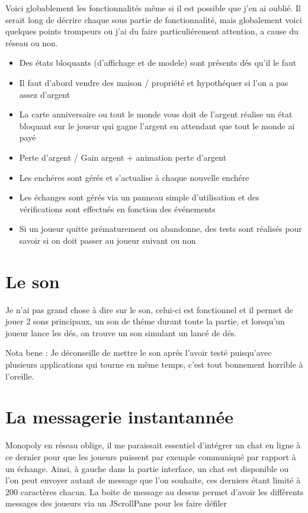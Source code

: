 \documentclass[12pt, openany]{report}
\begin{document}
Voici globablement les fonctionnalités même si il est possible que j'en ai oublié.
Il serait long de décrire chaque sous partie de fonctionnalité, mais globalement voici quelques points trompeurs ou j'ai du faire particuliérement attention, a cause du réseau ou non.


	\begin{itemize}
	    \item Des états bloquants (d'affichage et de modele) sont présents dés qu'il le faut
	    \item Il faut d'abord vendre des maison / propriété et hypothéquer si l'on a pas assez d'argent
	    \item La carte anniversaire ou tout le monde vous doit de l'argent réalise un état bloquant sur le joueur qui gagne l'argent en attendant que tout le monde ai payé
	    \item Perte d'argent / Gain argent + animation perte d'argent
	    \item Les enchéres sont gérés et s'actualise à chaque nouvelle enchére
	    \item Les échanges sont gérés via un panneau simple d'utilisation et des vérifications sont effectués en fonction des événements
	    \item Si un joueur quitte prématurement ou abandonne, des tests sont réalisés pour savoir si on doit passer au joueur suivant ou non
	\end{itemize}

    \section{Le son}
	Je n'ai pas grand chose à dire sur le son, celui-ci est fonctionnel et il permet de jouer 2 sons principaux, un son de théme durant toute la partie, et lorsqu'un joueur lance les dés, on trouve un son simulant un lancé de dés. 

	Nota bene : Je déconseille de mettre le son aprés l'avoir testé puisqu'avec plusieurs applications qui tourne en même temps, c'est tout bonnement horrible à l'oreille.

    \section{La messagerie instantannée}
	Monopoly en réseau oblige, il me paraissait essentiel d'intégrer un chat en ligne à ce dernier pour que les joueurs puissent par exemple communiqué par rapport à un échange. Ainsi, à gauche dans la partie interface, un chat est disponible ou l'on peut envoyer autant de message que l'on souhaite, ces derniers étant limité à 200 caractères chacun. La boite de message au dessus permet d'avoir les différents messages des joueurs via un JScrollPane pour les faire défiler
\end{document}
